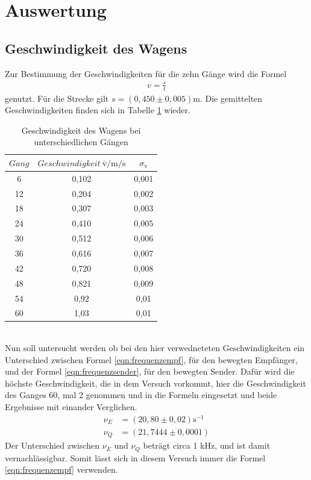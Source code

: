 \section{Auswertung}
\label{sec:Auswertung}
\subsection{Geschwindigkeit des Wagens}
Zur Bestimmung der Geschwindigkeiten für die zehn Gänge wird die Formel
\begin{align}
  v=\frac{s}{t}
\end{align}
genutzt. Für die Strecke gilt $s=(0,450\pm0,005)$m.
Die gemittelten Geschwindigkeiten finden sich in Tabelle \ref{tab:v} wieder.
\begin{table}
  \centering
  \caption{Geschwindigkeit des Wagens bei unterschiedlichen Gängen}
  \label{tab:v}
  \begin{tabular}{c c c}
    \toprule
    $Gang$ & $Geschwindigkeit\ \overline{\text{v}}/\si{\meter\per\second}$ & $\sigma_{\text{v}}$\\
    \midrule
    6  & 0,102 & 0,001\\
    12 & 0,204 & 0,002\\
    18 & 0,307 & 0,003\\
    24 & 0,410 & 0,005\\
    30 & 0,512 & 0,006\\
    36 & 0,616 & 0,007\\
    42 & 0,720 & 0,008\\
    48 & 0,821 & 0,009\\
    54 & 0,92  & 0,01\\
    60 & 1,03  & 0,01\\
    \bottomrule
   \end{tabular}
\end{table}\\
Nun soll untersucht werden ob bei den hier verwedneteten Geschwindigkeiten
ein Unterschied zwischen Formel \eqref{eqn:frequenzempf}, für den bewegten Empfänger,
und der Formel \eqref{eqn:frequenzsender}, für den bewegten Sender.
Dafür wird die höchste Geschwindigkeit, die in dem Versuch vorkommt,
hier die Geschwindigkeit des Ganges 60, mal 2 genommen und in die Formeln eingesetzt
und beide Ergebnisse mit einander Verglichen.
\begin{align}
  \nu_E&=(20,80\pm0,02)\si{\second\tothe{-1}}\\
  \nu_Q&=(21,7444\pm0,0001)
\end{align}
Der Unterschied zwischen $\nu_E$ und $\nu_Q$ beträgt circa 1 kHz, und ist damit
vernachlässigbar. Somit lässt sich in diesem Versuch immer die Formel \eqref{eqn:frequenzempf}
verwenden.

